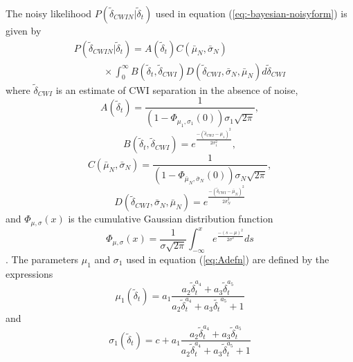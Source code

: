 \documentclass[extra]{gji}
\begin{document}
The noisy likelihood
$P(\widetilde{\delta}_{CWIN}|\widetilde{\delta}_t)$ used in equation
(\ref{eq:-bayesian-noisyform}) is given by
\begin{equation}
\begin{array}{l}
\label{eq-likelihood-int}
P(\widetilde{\delta}_{CWIN}|\widetilde{\delta}_t)  =
A(\widetilde{\delta}_t) C(\bar{\mu}_N, \bar{\sigma}_N)  \\
\hspace{3em} \times \int_0^\infty
B(\widetilde{\delta}_t,\widetilde{\delta}_{CWI})
D(\widetilde{\delta}_{CWI},\bar{\sigma}_N,\bar{\mu}_N )
d\widetilde{\delta}_{CWI}
\end{array}
\end{equation}
where $\widetilde{\delta}_{CWI}$ is an estimate of CWI separation in the absence
of noise,
\begin{equation}
\label{eq:Adefn}
A(\widetilde{\delta}_t) = \frac{1}{(1-\Phi_{\mu_1,\sigma_1}(0))\sigma_1\sqrt{2\pi} },
\end{equation}
\begin{equation}
B(\widetilde{\delta}_t,\widetilde{\delta}_{CWI})=e^{  \frac{-(\widetilde{\delta}_{CWI}-\mu_1)^2}{2\sigma_1^2} },
\end{equation}
\begin{equation}
\label{eq:Cdefn}
C(\bar{\mu}_N, \bar{\sigma}_N) =  \frac{1}{(1-\Phi_{\bar{\mu}_N,\bar{\sigma}_N}(0))\sigma_N\sqrt{2\pi}},
\end{equation}
\begin{equation}
D(\widetilde{\delta}_{CWI},\bar{\sigma}_N,\bar{\mu}_N )=e^{  \frac{-(\widetilde{\delta}_{CWI}-\bar{\mu}_N)^2}{2 \bar{\sigma}_N ^2} }
\end{equation}
and $\Phi_{\mu,\sigma}(x)$ is the cumulative Gaussian distribution function
\begin{equation}
\label{eq-cummulative-Gaussian}
\Phi_{\mu,\sigma}(x) = \frac{1}{\sigma \sqrt{2 \pi}}
\int_{-\infty}^x e^{  \frac{-(s-\mu)^2}{2\sigma^2}  } ds
\end{equation}
\citep{dr_Robinson11a}. The parameters $\mu_1$ and $\sigma_1$ used
in equation (\ref{eq:Adefn}) are defined by the expressions
\begin{equation}
\label{eq:mu1}
\mu_1(\widetilde{\delta}_t) = a_1\frac{a_2 \widetilde{\delta}_t^{a_4}+a_3
\widetilde{\delta}_t^{a_5}}{a_2 \widetilde{\delta}_t^{a_4}+a_3 \widetilde{\delta_t}^{a_5}+1}
\end{equation}
and
\begin{equation}
\label{eq:sigma1}
\sigma_1(\widetilde{\delta}_t) = c + a_1\frac{a_2 \widetilde{\delta}_t^{a_4}+
a_3 \widetilde{\delta}_t^{a_5}}{a_2 \widetilde{\delta}_t^{a_4}+a_3 \widetilde{\delta}_t^{a_5}+1}
\end{equation}
\end{document}
